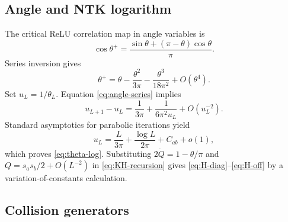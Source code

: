 \documentclass{article}
\begin{document}
\subsection{Angle and NTK logarithm}

The critical ReLU correlation map in angle variables is
\begin{equation}
\cos\theta^+=\frac{\sin\theta+(\pi-\theta)\cos\theta}{\pi}.
\end{equation}
Series inversion gives
\begin{equation}
\theta^+=\theta-\frac{\theta^2}{3\pi}
-\frac{\theta^3}{18\pi^2}+O(\theta^4).
\label{eq:angle-series}
\end{equation}
Set \(u_L=1/\theta_L\).  Equation \eqref{eq:angle-series} implies
\begin{equation}
u_{L+1}-u_L=\frac1{3\pi}+\frac1{6\pi^2u_L}+O(u_L^{-2}).
\end{equation}
Standard asymptotics for parabolic iterations yield
\begin{equation}
u_L=\frac{L}{3\pi}+\frac{\log L}{2\pi}+C_{ab}+o(1),
\end{equation}
which proves \eqref{eq:theta-log}.  Substituting
\(2\dot Q=1-\theta/\pi\) and \(Q=s_as_b/2+O(L^{-2})\) in
\eqref{eq:KH-recursion} gives \eqref{eq:H-diag}--\eqref{eq:H-off} by a
variation-of-constants calculation.

\subsection{Collision generators}
\end{document}
